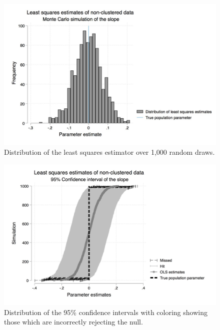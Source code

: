 \documentclass[notes=show]{beamer}
\begin{document}
\begin{frame}[plain]

\begin{figure}[htb]\centering
\includegraphics[scale=0.25]{./lecture_includes/ls_dist_hist_noclust.jpg}
\caption{Distribution of the least squares estimator over 1,000 random draws.}
\end{figure}

\end{frame}


\begin{frame}[plain]

\begin{figure}[htb] \centering \includegraphics[scale=0.15]{./lecture_includes/ls_ci_noclust.jpg}
\caption{Distribution of the 95\% confidence intervals with coloring showing those which are incorrectly rejecting the null.}
\end{figure}

\end{frame}
\end{document}
